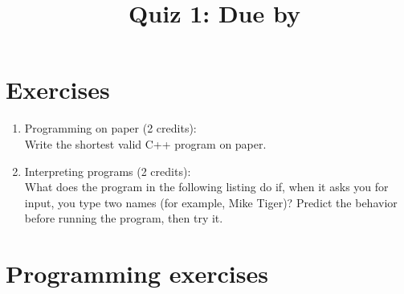 \documentclass[11pt]{article}
\begin{document}
\title{\coursename~Quiz 1: Due by }
\date{}
\maketitle

\medskip


\section*{Exercises}

\begin{enumerate}
\item Programming on paper (2 credits): \\
Write the shortest valid C++ program on paper.

\item Interpreting programs (2 credits): \\
What does the program in the following listing do if, when it asks you for input, you type two names (for example, Mike Tiger)? Predict the behavior before running the program, then try it.



\end{enumerate}

\section*{Programming exercises}
\end{document}
